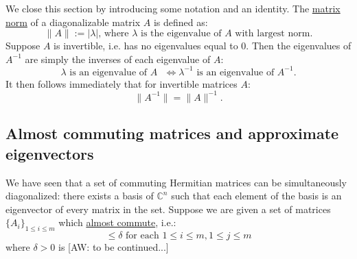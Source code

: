 \documentclass[a4paper]{article}
\newcommand{\aw}[1]{{\color{blue} [AW: #1]}}
\begin{document}
We close this section by introducing some notation and an identity. The \ul{matrix norm} of a diagonalizable matrix $A$ is defined as:
\begin{equation}
	\| A \| := \text{$|\lambda|$, where $\lambda$ is the eigenvalue of $A$ with largest norm.}
\end{equation}
Suppose $A$ is invertible, i.e. has no eigenvalues equal to $0$. Then the eigenvalues of $A^{-1}$ are simply the inverses of each eigenvalue of $A$:
\begin{equation}
	\text{$\lambda$ is an eigenvalue of $A$ } \iff \text{$\lambda^{-1}$ is an eigenvalue of $A^{-1}$}.
\end{equation}
It then follows immediately that for invertible matrices $A$:
\begin{equation}
	\| A^{-1} \| = \| A \|^{-1}.
\end{equation}

\subsection{Almost commuting matrices and approximate eigenvectors}

We have seen that a set of commuting Hermitian matrices can be simultaneously diagonalized: there exists a basis of $\mathbb{C}^n$ such that each element of the basis is an eigenvector of every matrix in the set. Suppose we are given a set of matrices $\{ A_i \}_{1 \leq i \leq m}$ which \ul{almost commute}, i.e.:
\begin{equation}
	[A_i,A_j] \leq \delta \text{ for each } 1 \leq i \leq m, 1 \leq j \leq m	
\end{equation}
where $\delta > 0$ is \aw{to be continued...}
\end{document}
